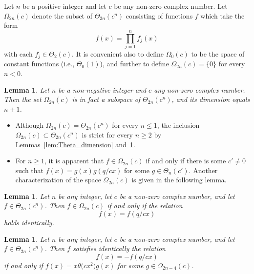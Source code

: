 \documentclass[10pt,a4paper]{amsart}
\numberwithin{equation}{section}
\newtheorem{Lemma}[Theorem]{Lemma}
\begin{document}
\begin{Definition} \label{def:Omega}
Let $n$ be a positive integer and let $c$ be any non-zero complex number. Let~$\Omega_{2n}(c)$ denote the subset of $\Theta_{2n}(c^n)$ consisting of functions $f$ which take the form
\[%
f(x) = \prod_{j=1}^n f_j(x)
\]
with each $f_j \in \Theta_2(c)$. It is convenient also to define $\Omega_0(c)$ to be the space of constant functions (i.e., $\Theta_0(1)$), and further to define $\Omega_{2n}(c) = \{0\}$ for every $n<0$.
\end{Definition}

\begin{Lemma} \label{lem:omega_dim}
Let $n$ be a non-negative integer and $c$ any non-zero complex number. Then the set $\Omega_{2n}(c)$ is in fact a subspace of $\Theta_{2n}(c^n)$, and its dimension equals $n+1$.
\end{Lemma}

\begin{Remark}\quad
\begin{itemize}\itemsep=0pt
\item[(i)] Although $\Omega_{2n}(c) = \Theta_{2n}(c^n)$ for every $n \leq 1$, the inclusion $\Omega_{2n}(c) \subset \Theta_{2n}(c^n)$ is strict for every $n \geq 2$ by Lemmas~\ref{lem:Theta_dimension} and~\ref{lem:omega_dim}.
\item[(ii)] For $n \geq 1$, it is apparent that $f \in \Omega_{2n}(c)$ if and only if there is some $c' \neq 0$ such that $f(x) = g(x) g(q/cx)$ for some $g \in \Theta_n(c')$. Another characterization of the space $\Omega_{2n}(c)$ is given in the following lemma.
\end{itemize}
\end{Remark}

\begin{Lemma} \label{lem:Omega_characterization}
Let $n$ be any integer, let $c$ be a non-zero complex number, and let $f \in \Theta_{2n}(c^n)$. Then $f \in \Omega_{2n}(c)$ if and only if the relation
\begin{equation} \label{eqn:2nth_order_theta_reciprocal_relation}
f(x) = f(q/cx)
\end{equation}
holds identically.
\end{Lemma}

\begin{Lemma} \label{lem:Omega_characterization_with_sign_changed}
Let $n$ be any integer, let $c$ be a non-zero complex number, and let $f \in \Theta_{2n}(c^n)$. Then $f$ satisfies identically the relation
\begin{equation} \label{eqn:2nth_order_theta_reciprocal_relation_with_minus}
f(x) = -f(q/cx)
\end{equation}
if and only if $f(x) = x\theta\big(cx^2\big) g(x)$ for some $g \in \Omega_{2n-4}(c)$.
\end{Lemma}
\end{document}
